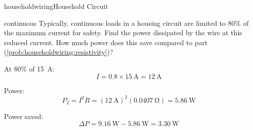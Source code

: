 \begin{mainquestion}{householdwiring}{Household Circuit}
\begin{partquestion}{continuous}
{Typically, continuous loads in a housing circuit are limited to $80\%$ of the maximum current for safety. Find the power dissipated by the wire at this reduced current. How much power does this save compared to part (\cref{prob:householdwiring:resistivity})?}

\begin{answer}
At $80\%$ of \qty{15}{\ampere}:
\[
I = 0.8 \times \qty{15}{\ampere} = \qty{12}{\ampere}
\]

Power:
\[
P_2 = I^2 R = (\qty{12}{\ampere})^2 (\qty{0.0407}{\ohm}) = \qty{5.86}{\watt}
\]

Power saved:
\[
\Delta P = \qty{9.16}{\watt} - \qty{5.86}{\watt} = \qty{3.30}{\watt}
\]

\end{answer}
\end{partquestion}

\end{mainquestion}